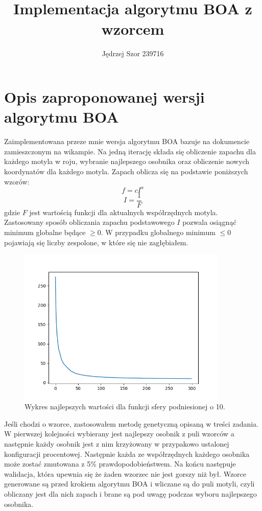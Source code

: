 \documentclass[12pt]{article}
\begin{document}
\author{Jędrzej Szor 239716}
\title{\\\textbf{Implementacja algorytmu BOA z wzorcem}}
\maketitle

\section{Opis zaproponowanej wersji algorytmu BOA}
Zaimplementowana przeze mnie wersja algorytmu BOA bazuje na dokumencie zamieszczonym na wikampie. Na jedną iterację składa się obliczenie zapachu dla każdego motyla w roju, wybranie najlepszego osobnika oraz obliczenie nowych koordynatów dla każdego motyla. Zapach oblicza się na podstawie poniższych wzorów:
\begin{equation}
    f = cI^a
\end{equation}
\begin{equation}
    I = \frac{1}{F}
\end{equation}
gdzie $F$ jest wartością funkcji dla aktualnych współrzędnych motyla.\\
Zastosowany sposób obliczania zapachu podstawowego $I$ pozwala osiągnąć minimum globalne będące $\geq 0$. W przypadku globalnego minimum $\le 0$ pojawiają się liczby zespolone, w które się nie zagłębiałem.
\begin{figure}[H]
    \centering
    \includegraphics[width=10cm]{plots/up10.png}
    \caption{Wykres najlepszych wartości dla funkcji sfery podniesionej o 10.}
\end{figure}

Jeśli chodzi o wzorce, zastosowałem metodę genetyczną opisaną w treści zadania. W pierwszej kolejności wybierany jest najlepszy osobnik z puli wzorców a następnie każdy osobnik jest z nim krzyżowany w przypakowo ustalonej konfiguracji procentowej. Następnie każda ze współrzędnych każdego osobnika może zostać zmutowana z 5\% prawdopodobieństwem. Na końcu następuje walidacja, która upewnia się że żaden wzorzec nie jest gorszy niż był. Wzorce generowane są przed krokiem algorytmu BOA i wliczane są do puli motyli, czyli obliczany jest dla nich zapach i brane są pod uwagę podczas wyboru najlepszego osobnika. 
\end{document}
